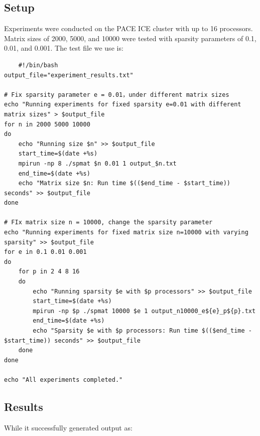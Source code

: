 \documentclass{article}
\begin{document}
\subsection{Setup}
Experiments were conducted on the PACE ICE cluster with up to 16 processors. Matrix sizes of 2000, 5000, and 10000 were tested with sparsity parameters of 0.1, 0.01, and 0.001. The test file we use is:

\begin{verbatim}
    #!/bin/bash
output_file="experiment_results.txt"

# Fix sparsity parameter e = 0.01，under different matrix sizes
echo "Running experiments for fixed sparsity e=0.01 with different matrix sizes" > $output_file
for n in 2000 5000 10000
do
    echo "Running size $n" >> $output_file
    start_time=$(date +%s)
    mpirun -np 8 ./spmat $n 0.01 1 output_$n.txt
    end_time=$(date +%s)
    echo "Matrix size $n: Run time $(($end_time - $start_time)) seconds" >> $output_file
done

# FIx matrix size n = 10000, change the sparsity parameter
echo "Running experiments for fixed matrix size n=10000 with varying sparsity" >> $output_file
for e in 0.1 0.01 0.001
do
    for p in 2 4 8 16
    do
        echo "Running sparsity $e with $p processors" >> $output_file
        start_time=$(date +%s)
        mpirun -np $p ./spmat 10000 $e 1 output_n10000_e${e}_p${p}.txt
        end_time=$(date +%s)
        echo "Sparsity $e with $p processors: Run time $(($end_time - $start_time)) seconds" >> $output_file
    done
done

echo "All experiments completed."
\end{verbatim}

\subsection{Results}
While it successfully generated output as:
\end{document}
